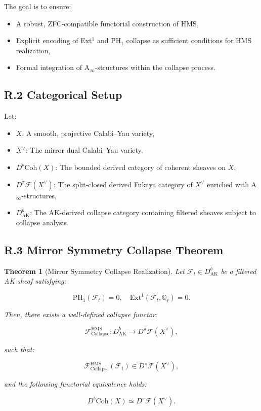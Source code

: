 \documentclass[11pt]{article}
\newtheorem{theorem}{Theorem}[section]
\begin{document}
The goal is to ensure:
\begin{itemize}
  \item A robust, ZFC-compatible functorial construction of HMS,
  \item Explicit encoding of Ext$^1$ and PH$_1$ collapse as sufficient conditions for HMS realization,
  \item Formal integration of A$_\infty$-structures within the collapse process.
\end{itemize}

\subsection*{R.2 Categorical Setup}

Let:
\begin{itemize}
  \item $X$: A smooth, projective Calabi–Yau variety,
  \item $X^\vee$: The mirror dual Calabi–Yau variety,
  \item $D^b\mathrm{Coh}(X)$: The bounded derived category of coherent sheaves on $X$,
  \item $D^\pi\mathcal{F}(X^\vee)$: The split-closed derived Fukaya category of $X^\vee$ enriched with A$_\infty$-structures,
  \item $D^b_{\mathrm{AK}}$: The AK-derived collapse category containing filtered sheaves subject to collapse analysis.
\end{itemize}

\subsection*{R.3 Mirror Symmetry Collapse Theorem}

\begin{theorem}[Mirror Symmetry Collapse Realization]
Let $\mathcal{F}_t \in D^b_{\mathrm{AK}}$ be a filtered AK sheaf satisfying:

\[
\mathrm{PH}_1(\mathcal{F}_t) = 0, \quad \mathrm{Ext}^1(\mathcal{F}_t, \mathbb{Q}_\ell) = 0.
\]

Then, there exists a well-defined collapse functor:

\[
\mathcal{F}_{\mathrm{Collapse}}^{\mathrm{HMS}} : D^b_{\mathrm{AK}} \longrightarrow D^\pi\mathcal{F}(X^\vee),
\]

such that:

\[
\mathcal{F}_{\mathrm{Collapse}}^{\mathrm{HMS}}(\mathcal{F}_t) \in D^\pi\mathcal{F}(X^\vee),
\]

and the following functorial equivalence holds:

\[
D^b\mathrm{Coh}(X) \simeq D^\pi\mathcal{F}(X^\vee).
\]
\end{theorem}
\end{document}
